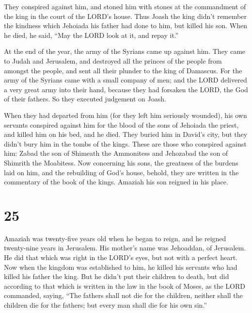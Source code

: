  They conspired against him, and stoned him with stones at
the commandment of the king in the court of the LORD's house.
 Thus Joash the king didn't remember the kindness which
Jehoiada his father had done to him, but killed his son. When he died,
he said, ``May the LORD look at it, and repay it.''

 At the end of the year, the army of the Syrians came up
against him. They came to Judah and Jerusalem, and destroyed all the
princes of the people from amongst the people, and sent all their
plunder to the king of Damascus.  For the army of the
Syrians came with a small company of men; and the LORD delivered a very
great army into their hand, because they had forsaken the LORD, the God
of their fathers. So they executed judgement on Joash.

 When they had departed from him (for they left him
seriously wounded), his own servants conspired against him for the blood
of the sons of Jehoiada the priest, and killed him on his bed, and he
died. They buried him in David's city, but they didn't bury him in the
tombs of the kings.  These are those who conspired against
him: Zabad the son of Shimeath the Ammonitess and Jehozabad the son of
Shimrith the Moabitess.  Now concerning his sons, the
greatness of the burdens laid on him, and the rebuilding of God's house,
behold, they are written in the commentary of the book of the kings.
Amaziah his son reigned in his place.

\hypertarget{section-24}{%
\section{25}\label{section-24}}

 Amaziah was twenty-five years old when he began to reign,
and he reigned twenty-nine years in Jerusalem. His mother's name was
Jehoaddan, of Jerusalem.  He did that which was right in the
LORD's eyes, but not with a perfect heart.  Now when the
kingdom was established to him, he killed his servants who had killed
his father the king.  But he didn't put their children to
death, but did according to that which is written in the law in the book
of Moses, as the LORD commanded, saying, ``The fathers shall not die for
the children, neither shall the children die for the fathers; but every
man shall die for his own sin.''

